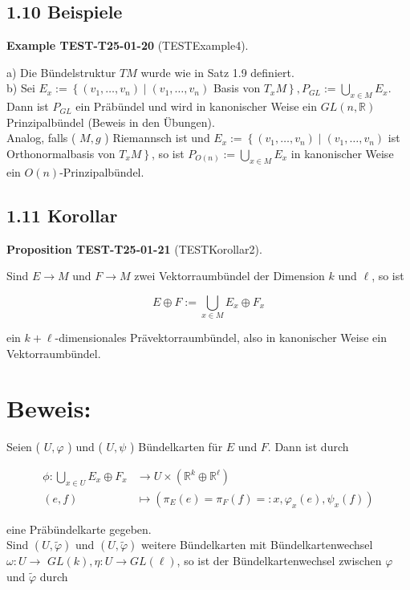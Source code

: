 \documentclass[10pt, letterpaper]{article}
\newcommand{\CustomHeading}[3]{%
  \par\medskip\noindent%
  \textbf{#1 #2} \textnormal{(#3)}.\enskip%
}
\newenvironment{PROP}[2]{\begin{unitbox}\CustomHeading{Proposition}{#1}{#2}}{\end{unitbox}}
\newenvironment{EXA}[2]{\begin{unitbox}\CustomHeading{Example}{#1}{#2}}{\end{unitbox}}
\begin{document}
\subsection*{1.10 Beispiele}
\begin{EXA}{TEST-T25-01-20}{TESTExample4}
a) Die Bündelstruktur $T M$ wurde wie in Satz 1.9 definiert.\\
b) Sei $E_{x}:=\left\{\left(v_{1}, \ldots, v_{n}\right) \mid\left(v_{1}, \ldots, v_{n}\right)\right.$ Basis von $\left.T_{x} M\right\}, P_{G L}:=\bigcup_{x \in M} E_{x}$. Dann ist $P_{G L}$ ein Präbündel und wird in kanonischer Weise ein $G L(n, \mathbb{R})$ Prinzipalbündel (Beweis in den Übungen).\\
Analog, falls ( $M, g$ ) Riemannsch ist und $E_{x}:=\left\{\left(v_{1}, \ldots, v_{n}\right) \mid\left(v_{1}, \ldots, v_{n}\right)\right.$ ist Orthonormalbasis von $\left.T_{x} M\right\}$, so ist $P_{O(n)}:=\bigcup_{x \in M} E_{x}$ in kanonischer Weise ein $O(n)$-Prinzipalbündel.
\end{EXA}

\subsection*{1.11 Korollar}
\begin{PROP}{TEST-T25-01-21}{TESTKorollar2}
Sind $E \rightarrow M$ und $F \rightarrow M$ zwei Vektorraumbündel der Dimension $k$ und $\ell$, so ist

$$
E \oplus F:=\bigcup_{x \in M} E_{x} \oplus F_{x}
$$

ein $k+\ell$-dimensionales Prävektorraumbündel, also in kanonischer Weise ein Vektorraumbündel.
\end{PROP}

\section*{Beweis:}
Seien ( $U, \varphi$ ) und ( $U, \psi$ ) Bündelkarten für $E$ und $F$. Dann ist durch

$$
\begin{aligned}
\phi: \bigcup_{x \in U} E_{x} \oplus F_{x} & \rightarrow U \times\left(\mathbb{R}^{k} \oplus \mathbb{R}^{\ell}\right) \\
(e, f) & \mapsto\left(\pi_{E}(e)=\pi_{F}(f)=: x, \varphi_{x}(e), \psi_{x}(f)\right)
\end{aligned}
$$

eine Präbündelkarte gegeben.\\
Sind $(U, \tilde{\varphi})$ und $(U, \tilde{\varphi})$ weitere Bündelkarten mit Bündelkartenwechsel $\omega: U \rightarrow$ $G L(k), \eta: U \rightarrow G L(\ell)$, so ist der Bündelkartenwechsel zwischen $\varphi$ und $\tilde{\varphi}$ durch
\end{document}
